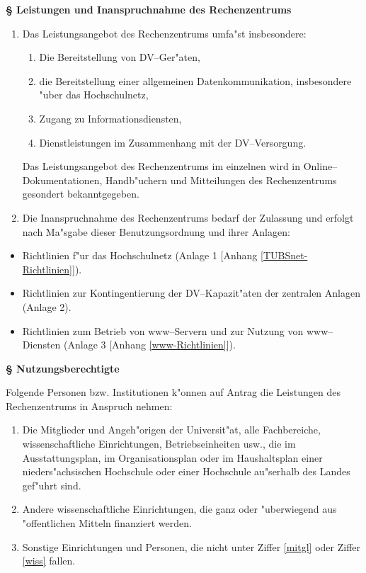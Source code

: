 \documentclass[12pt,titlepage,twoside]{scrartcl}
\newcounter{para_nr}
\newcommand{\Paragraph}[1]{{\large\bf\S{}\sf\textbf{\/\stepcounter{para_nr}\arabic{para_nr} #1}}}
\begin{document}
\begin{appendix}
\Paragraph{Leistungen und Inanspruchnahme des Rechenzentrums}

\renewcommand{\labelenumi}{(\arabic{enumi})}
\renewcommand{\labelenumii}{\arabic{enumii}.}
\begin{enumerate}
  \item Das Leistungsangebot des Rechenzentrums umfa"st insbesondere:
    \begin{enumerate}
      \item Die Bereitstellung von DV--Ger"aten,
      \item die Bereitstellung einer allgemeinen Datenkommunikation,
        insbesondere "uber das Hochschulnetz,
      \item Zugang zu Informationsdiensten,
      \item Dienstleistungen im Zusammenhang mit der DV--Versorgung.
    \end{enumerate}

    Das Leistungsangebot des Rechenzentrums im einzelnen wird in
    Online--Do\-ku\-mentationen, Handb"uchern und Mitteilungen des
    Rechenzentrums gesondert bekanntgegeben.

  \item Die Inanspruchnahme des Rechenzentrums bedarf der Zulassung und erfolgt
    nach Ma"sgabe dieser Benutzungsordnung und ihrer Anlagen:
\end{enumerate}

\begin{itemize}
 \item Richtlinien f"ur das Hochschulnetz (Anlage 1 [Anhang
   \ref{TUBSnet-Richtlinien}]).
 \item Richtlinien zur Kontingentierung der DV--Kapazit"aten der
       zentralen Anlagen (Anlage 2).
 \item Richtlinien zum Betrieb von www--Servern und zur Nutzung von
       www--Diensten (Anlage 3 [Anhang \ref{www-Richtlinien}]).
\end{itemize}

\Paragraph{Nutzungsberechtigte}

Folgende Personen bzw. Institutionen k"onnen auf Antrag die Leistungen
des Rechenzentrums in Anspruch nehmen:

\begin{enumerate}
 \renewcommand{\labelenumi}{\arabic{enumi}.}
 \item \label{mitgl} Die Mitglieder und Angeh"origen der Universit"at, alle
       Fachbereiche, wissenschaftliche Einrichtungen, Betriebseinheiten
       usw., die im Ausstattungsplan, im Organisationsplan oder im
       Haushaltsplan einer nieders"achsischen Hochschule oder einer
       Hochschule au"serhalb des Landes gef"uhrt sind.
 \item \label{wiss} Andere wissenschaftliche Einrichtungen, die ganz oder
       "uberwiegend aus "offentlichen Mitteln finanziert
       werden.
 \item Sonstige Einrichtungen und Personen, die nicht unter
       Ziffer \ref{mitgl} oder Ziffer \ref{wiss} fallen.
\end{enumerate}


\end{appendix}
\end{document}
